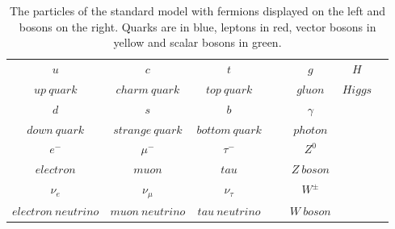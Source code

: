 \begin{table}[h]
  \centering
  \begin{tabular}{|c|c|c|c|c|c|c|}
    \hhline{---|~|--}
    \cellcolor{blue!18} $u$ &
    \cellcolor{blue!18} $c$ &
    \cellcolor{blue!18} $t$ &
    ~ &
    \cellcolor{yellow!18} $g$ &
    \cellcolor{green!18} $H$
    \\
    \cellcolor{blue!18} \small{$up~quark$} &
    \cellcolor{blue!18} \small{$charm~quark$} &
    \cellcolor{blue!18} \small{$top~quark$} &
    ~ &
    \cellcolor{yellow!18} \small{$gluon$} &
    \cellcolor{green!18} \small{$Higgs$}
    \\
    \cline{1-3}
    \cline{5-6}
    \cellcolor{blue!18} $d$ &
    \cellcolor{blue!18} $s$ &
    \cellcolor{blue!18} $b$ &
    ~ &
    \cellcolor{yellow!18} $\gamma$
    \\
    \cellcolor{blue!18} \small{$down~quark$} &
    \cellcolor{blue!18} \small{$strange~quark$} &
    \cellcolor{blue!18} \small{$bottom~quark$} &
    ~ &
    \cellcolor{yellow!18} \small{$photon$}
    \\
    \hhline{---~|-|~}
    \cellcolor{red!18} $e^-$ &
    \cellcolor{red!18} $\mu^{-}$ &
    \cellcolor{red!18} $\tau^-$ &
    ~ &
    \cellcolor{yellow!18} $Z^0$
    \\
    \cellcolor{red!18} \small{$electron$} &
    \cellcolor{red!18} \small{$muon$} &
    \cellcolor{red!18} \small{$tau$} &
    ~ &
    \cellcolor{yellow!18} \small{$Z~boson$}
    \\
    \cline{1-3}
    \cline{5-5}
    \cellcolor{red!18} $\nu_{e}$ &
    \cellcolor{red!18} $\nu_{\mu}$ &
    \cellcolor{red!18} $\nu_{\tau}$ &
    ~ &
    \cellcolor{yellow!18} $W^\pm$
    \\
    \cellcolor{red!18} \small{$electron~neutrino$} &
    \cellcolor{red!18} \small{$muon~neutrino$} &
    \cellcolor{red!18} \small{$tau~neutrino$} &
    ~ &
    \cellcolor{yellow!18} \small{$W~boson$}
    \\
    \cline{1-3}
    \cline{5-5}
  \end{tabular}
  \caption{The particles of the standard model with fermions displayed on the left and bosons on the right.
    Quarks are in blue, leptons in red, vector bosons in yellow and scalar bosons in green.}
  \label{tab:sm}
\end{table}
